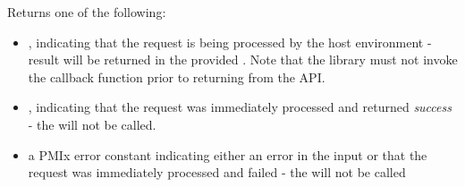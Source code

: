 \begin{arglist}
\end{arglist}

\descr

Returns one of the following:

\begin{itemize}
    \item {}, indicating that the request is being processed by the host environment - result will be returned in the provided . Note that the library must not invoke the callback function prior to returning from the \ac{API}.
    \item {}, indicating that the request was immediately processed and returned \textit{success} - the  will not be called.
    \item a \ac{PMIx} error constant indicating either an error in the input or that the request was immediately processed and failed - the  will not be called
\end{itemize}


\descr



